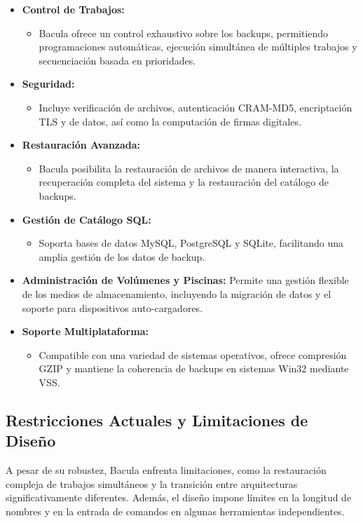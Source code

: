 \begin{itemize}
  \item \textbf{Control de Trabajos:} \begin{itemize} \item Bacula ofrece un control exhaustivo sobre los backups, permitiendo programaciones automáticas, ejecución simultánea de múltiples trabajos y secuenciación basada en prioridades.\end{itemize}
  \item \textbf{Seguridad:}  \begin{itemize} \item Incluye verificación de archivos, autenticación CRAM-MD5, encriptación TLS y de datos, así como la computación de firmas digitales.\end{itemize}
  \item \textbf{Restauración Avanzada:} \begin{itemize} \item Bacula posibilita la restauración de archivos de manera interactiva, la recuperación completa del sistema y la restauración del catálogo de backups.\end{itemize}
  \item \textbf{Gestión de Catálogo SQL:}  \begin{itemize} \item Soporta bases de datos MySQL, PostgreSQL y SQLite, facilitando una amplia gestión de los datos de backup.\end{itemize}
  \item \textbf{Administración de Volúmenes y Piscinas:} Permite una gestión flexible de los medios de almacenamiento, incluyendo la migración de datos y el soporte para dispositivos auto-cargadores.
  \item \textbf{Soporte Multiplataforma:}  \begin{itemize} \item Compatible con una variedad de sistemas operativos, ofrece compresión GZIP y mantiene la coherencia de backups en sistemas Win32 mediante VSS.\end{itemize}
\end{itemize}

\subsection{Restricciones Actuales y Limitaciones de Diseño}


A pesar de su robustez, Bacula enfrenta limitaciones, como la restauración compleja de trabajos simultáneos y la transición entre arquitecturas significativamente diferentes. Además, el diseño impone límites en la longitud de nombres y en la entrada de comandos en algunas herramientas independientes.\medskip

